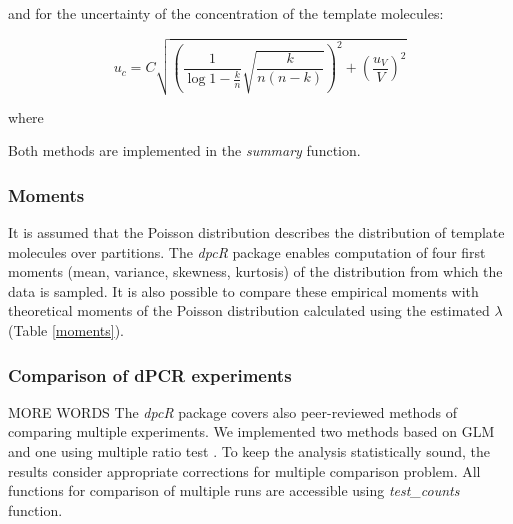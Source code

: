 \documentclass[a4,center,fleqn]{NAR}
\begin{document}
and for the uncertainty of the concentration of the template molecules:

\begin{equation}
u_{c} = C \sqrt{ \left( \frac{1}{\log{1 - \frac{k}{n} }} 
\sqrt{\frac{k}{n (n - k)}} \right)^2 
+ \left( \frac{u_V}{V} \right)^2}
\end{equation}

where

Both methods are implemented in the \textit{summary} function.

\subsubsection{Moments}

\begin{table}[b]
 {}
\end{table}

It is assumed that the Poisson distribution describes the distribution of 
template molecules over partitions. The \textit{dpcR} package enables 
computation of four first moments (mean, variance, skewness, kurtosis) of the 
distribution from which the data is sampled. It is also possible to compare 
these empirical moments with theoretical moments of the Poisson distribution 
calculated using the estimated $\lambda$ (Table \ref{moments}).

\subsubsection{Comparison of dPCR experiments}
MORE WORDS
The \textit{dpcR} package covers also peer-reviewed methods of comparing 
multiple experiments. We implemented two methods based on GLM and one using  
multiple ratio test \cite{Burdukiewicz_tba, dorazio_statistical_2015}. To 
keep the analysis statistically sound, the results consider appropriate 
corrections for multiple comparison problem. All functions for comparison of 
multiple runs are accessible using \textit{test\_counts} function.
\end{document}
